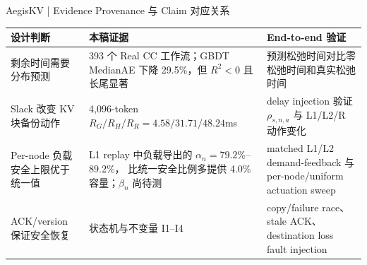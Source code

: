 \begin{frame}{AegisKV | Evidence Provenance 与 Claim 对应关系}
  \scriptsize
  \renewcommand{\arraystretch}{1.15}
  \begin{tabularx}{\textwidth}{p{}p{}X}
    \toprule
    设计判断 & 本稿证据 & End-to-end 验证 \\
    \midrule
    剩余时间需要分布预测
      & 393 个 Real CC 工作流；GBDT MedianAE 下降 29.5\%，但 $R^2<0$ 且长尾显著
      & 预测松弛时间对比零松弛时间和真实松弛时间 \\
    Slack 改变 KV 块备份动作
      & 4,096-token $R_G/R_H/R_R=4.58/31.71/48.24$ms
      & delay injection 验证 $\rho_{s,n,a}$ 与 L1/L2/R 动作变化 \\
    Per-node 负载安全上限优于统一值
      & L1 replay 中负载导出的 $\alpha_n=79.2\%$--$89.2\%$，
        比统一安全比例多提供 4.0\% 容量；$\beta_n$ 尚待测
      & matched L1/L2 demand-feedback 与 per-node/uniform actuation sweep \\
    ACK/version 保证安全恢复
      & 状态机与不变量 I1--I4
      & copy/failure race、stale ACK、destination loss fault injection \\
    \bottomrule
  \end{tabularx}

  \vspace{0.10cm}
\end{frame}
